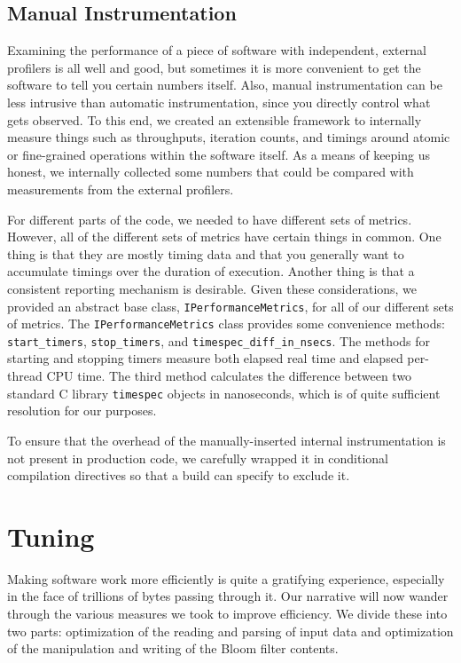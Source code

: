 \documentclass{article}
\begin{document}
\subsection{Manual Instrumentation}

Examining the performance of a piece of software with independent, external
profilers is all well and good, but sometimes it is more convenient to get the
software to tell you certain numbers itself. Also, manual instrumentation can
be less intrusive than automatic instrumentation, since you directly control
what gets observed. To this end, we created an extensible framework to
internally measure things such as throughputs, iteration counts, and timings
around atomic or fine-grained operations within the software itself. As a means
of keeping us honest, we internally collected some numbers that could be
compared with measurements from the external profilers.

For different parts of the code, we needed to have different sets of metrics.
However, all of the different sets of metrics have certain things in common.
One thing is that they are mostly timing data and that you generally want to
accumulate timings over the duration of execution. Another thing is that a
consistent reporting mechanism is desirable. Given these considerations, we
provided an abstract base class, \texttt{IPerformanceMetrics}, for all of our
different sets of metrics. The \texttt{IPerformanceMetrics} class provides some
convenience methods: \texttt{start\_timers}, \texttt{stop\_timers}, and
\texttt{timespec\_diff\_in\_nsecs}. The methods for starting and stopping
timers measure both elapsed real time and elapsed per-thread CPU time. The
third method calculates the difference between two standard C library
\texttt{timespec} objects in nanoseconds, which is of quite sufficient
resolution for our purposes.

To ensure that the overhead of the manually-inserted internal instrumentation
is not present in production code, we carefully wrapped it in conditional
compilation directives so that a build can specify to exclude it.

\section{Tuning}

Making software work more efficiently is quite a gratifying experience,
especially in the face of trillions of bytes passing through it. Our narrative
will now wander through the various measures we took to improve efficiency. We
divide these into two parts: optimization of the reading and parsing of input
data and optimization of the manipulation and writing of the Bloom filter
contents.
\end{document}
